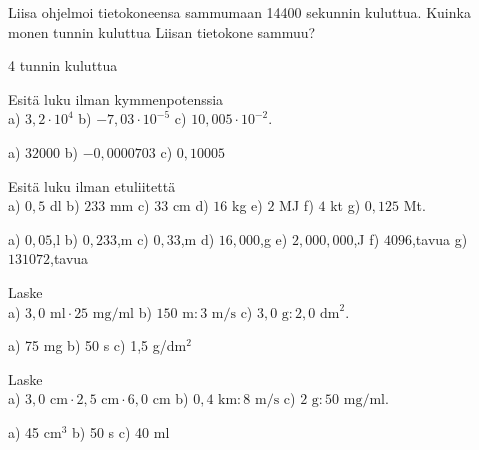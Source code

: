 \begin{tehtavasivu}
\begin{tehtava}
Liisa ohjelmoi tietokoneensa sammumaan 14400 sekunnin kuluttua.
Kuinka monen tunnin kuluttua Liisan tietokone sammuu?
\begin{vastaus}
4 tunnin kuluttua
\end{vastaus}
\end{tehtava}


\begin{tehtava}
Esitä luku ilman kymmenpotenssia \\
a) $3,2 \cdot 10^4$ \quad
b) $-7,03 \cdot 10^{-5}$ \quad
c) $10,005 \cdot 10^{-2}$. \quad
\begin{vastaus}
a) $32000$ \qquad
b) $-0,0000703$ \qquad
c) $0,10005$ \qquad
\end{vastaus}
\end{tehtava}


\begin{tehtava}
Esitä luku ilman etuliitettä \\
a) $0,5$ dl \qquad
b) $233$ mm \qquad
c) $33$ cm \qquad
d) $16$ kg \qquad
e) $2$ MJ \qquad
f) $4$ kt \qquad
g) $0,125$ Mt.
\begin{vastaus}
a) $0,05$,l \qquad
b) $0,233$,m \qquad
c) $0,33$,m \qquad
d) $16,000$,g \qquad
e) $2,000,000$,J \qquad
f) $4096$,tavua \qquad
g) $131072$,tavua
\end{vastaus}
\end{tehtava}


\begin{tehtava}
Laske \\
a) $3,0 \textrm{ ml} \cdot 25 \textrm{ mg/ml}$ \qquad
b) $150 \textrm{ m} : 3 \textrm{ m/s}$ \qquad
c) $3,0 \textrm{ g} : 2,0 \textrm{ dm}^2$.
\begin{vastaus}
a) 75 mg \qquad
b) 50 s \qquad
c) 1,5 g/dm$^2$
\end{vastaus}
\end{tehtava}

\begin{tehtava}
Laske \\
a) $3,0 \textrm{ cm} \cdot 2,5 \textrm{ cm} \cdot 6,0 \textrm{ cm}$ \qquad
b) $0,4 \textrm{ km} : 8 \textrm{ m/s}$ \qquad
c) $2 \textrm{ g} : 50 \textrm{ mg/ml}$.
\begin{vastaus}
a) 45 cm$^3$ \qquad
b) 50 s \qquad
c) 40 ml
\end{vastaus}
\end{tehtava}


\end{tehtavasivu}
